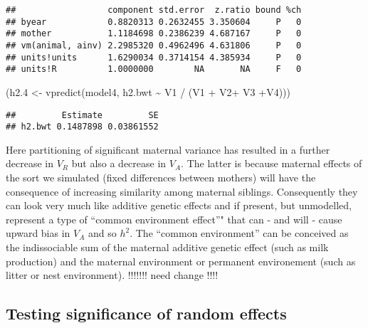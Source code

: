 \documentclass[
  12pt,
]{book}
\newenvironment{Shaded}{\begin{snugshade}}{\end{snugshade}}
\newcommand{\FloatTok}[1]{\textcolor[rgb]{0.00,0.00,0.81}{#1}}
\newcommand{\FunctionTok}[1]{\textcolor[rgb]{0.00,0.00,0.00}{#1}}
\newcommand{\NormalTok}[1]{#1}
\newcommand{\OtherTok}[1]{\textcolor[rgb]{0.56,0.35,0.01}{#1}}
\newcommand{\SpecialCharTok}[1]{\textcolor[rgb]{0.00,0.00,0.00}{#1}}
\begin{document}
\begin{Shaded}
\end{Shaded}

\begin{verbatim}
##                  component std.error  z.ratio bound %ch
## byear            0.8820313 0.2632455 3.350604     P   0
## mother           1.1184698 0.2386239 4.687167     P   0
## vm(animal, ainv) 2.2985320 0.4962496 4.631806     P   0
## units!units      1.6290034 0.3714154 4.385934     P   0
## units!R          1.0000000        NA       NA     F   0
\end{verbatim}

\begin{Shaded}
\begin{Highlighting}[]
\NormalTok{(h2}\FloatTok{.4} \OtherTok{\textless{}{-}} \FunctionTok{vpredict}\NormalTok{(model4, h2.bwt }\SpecialCharTok{\textasciitilde{}}\NormalTok{ V1 }\SpecialCharTok{/}\NormalTok{ (V1 }\SpecialCharTok{+}\NormalTok{ V2}\SpecialCharTok{+}\NormalTok{ V3 }\SpecialCharTok{+}\NormalTok{V4)))}
\end{Highlighting}
\end{Shaded}

\begin{verbatim}
##         Estimate         SE
## h2.bwt 0.1487898 0.03861552
\end{verbatim}

Here partitioning of significant maternal variance has resulted in a further decrease in \(V_R\) but also a decrease in \(V_A\). The latter is because maternal effects of the sort we simulated (fixed differences between mothers) will have the consequence of increasing similarity among maternal siblings. Consequently they can look very much like additive genetic effects and if present, but unmodelled, represent a type of ``common environment effect''" that can - and will - cause upward bias in \(V_A\) and so \(h^2\).
The ``common environment'' can be conceived as the indissociable sum of the maternal additive genetic effect (such as milk production) and the maternal environment or permanent environement (such as litter or nest environment). !!!!!!! need change !!!!

\hypertarget{testing-significance-of-random-effects}{%
\subsection{Testing significance of random effects}\label{testing-significance-of-random-effects}}
\end{document}
